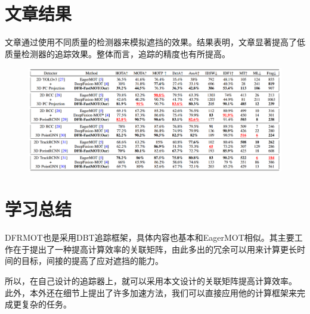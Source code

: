 \section{文章结果}
文章通过使用不同质量的检测器来模拟遮挡的效果。结果表明，文章显著提高了低质量检测器的追踪效果。整体而言，追踪的精度也有所提高。
\begin{figure}
	\centering
	\includegraphics[width=\textwidth]{images/DFRMOT/result.png}
\end{figure}


\section{学习总结}
DFRMOT也是采用DBT追踪框架，具体内容也基本和EagerMOT相似。其主要工作在于提出了一种提高计算效率的关联矩阵，由此多出的冗余可以用来计算更长时间的目标，间接的提高了应对遮挡的能力。

所以，在自己设计的追踪器上，就可以采用本文设计的关联矩阵提高计算效率。
此外，本外还在细节上提出了许多加速方法，我们可以直接应用他的计算框架来完成更复杂的任务。